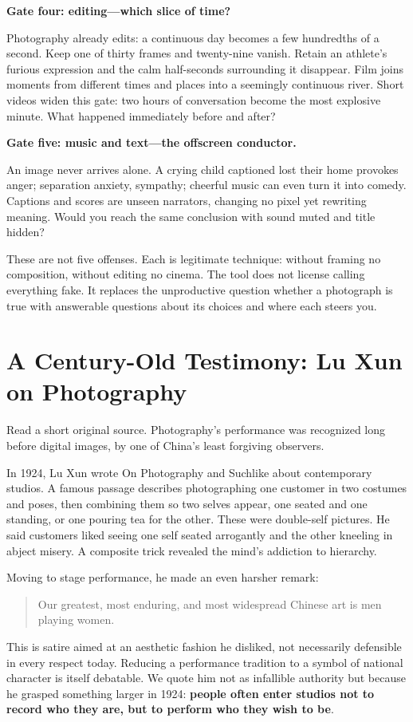 \textbf{Gate four: editing---which slice of time?}

Photography already edits: a continuous day becomes a few hundredths of a second. Keep one of thirty frames and twenty-nine vanish. Retain an athlete's furious expression and the calm half-seconds surrounding it disappear. Film joins moments from different times and places into a seemingly continuous river. Short videos widen this gate: two hours of conversation become the most explosive minute. What happened immediately before and after?

\textbf{Gate five: music and text---the offscreen conductor.}

An image never arrives alone. A crying child captioned lost their home provokes anger; separation anxiety, sympathy; cheerful music can even turn it into comedy. Captions and scores are unseen narrators, changing no pixel yet rewriting meaning. Would you reach the same conclusion with sound muted and title hidden?

These are not five offenses. Each is legitimate technique: without framing no composition, without editing no cinema. The tool does not license calling everything fake. It replaces the unproductive question whether a photograph is true with answerable questions about its choices and where each steers you.

\section[Lu Xun on Photography]{A Century-Old Testimony: Lu Xun on Photography}
Read a short original source. Photography's performance was recognized long before digital images, by one of China's least forgiving observers.

In 1924, Lu Xun wrote On Photography and Suchlike about contemporary studios. A famous passage describes photographing one customer in two costumes and poses, then combining them so two selves appear, one seated and one standing, or one pouring tea for the other. These were double-self pictures. He said customers liked seeing one self seated arrogantly and the other kneeling in abject misery. A composite trick revealed the mind's addiction to hierarchy.

Moving to stage performance, he made an even harsher remark:

\begin{quote}
Our greatest, most enduring, and most widespread Chinese art is men playing women.
\end{quote}
This is satire aimed at an aesthetic fashion he disliked, not necessarily defensible in every respect today. Reducing a performance tradition to a symbol of national character is itself debatable. We quote him not as infallible authority but because he grasped something larger in 1924: \textbf{people often enter studios not to record who they are, but to perform who they wish to be}.

